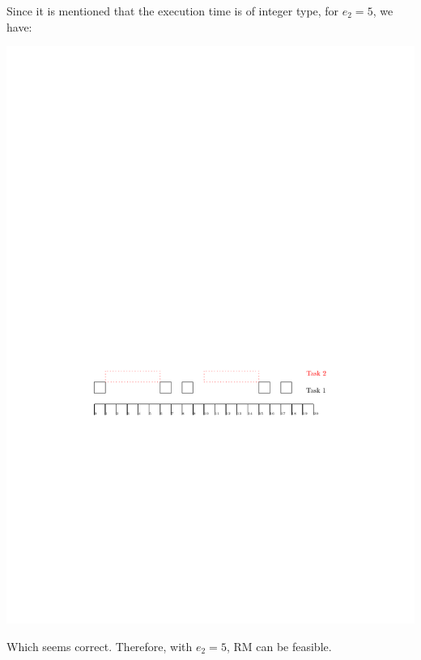 \documentclass[12pt]{article}
\begin{document}
\begin{enumerate}
\begin{qsolve}
		Since it is mentioned that the execution time is of integer type, for $e_2=5$, we have:
		\begin{center}
			\includegraphics*[width=0.7\linewidth]{images/Q4/c_2.pdf}
		\end{center}
		
		Which seems correct. Therefore, with $e_2=5$, RM can be feasible.
	\end{qsolve}
	
	
	

\end{enumerate}
\end{document}
